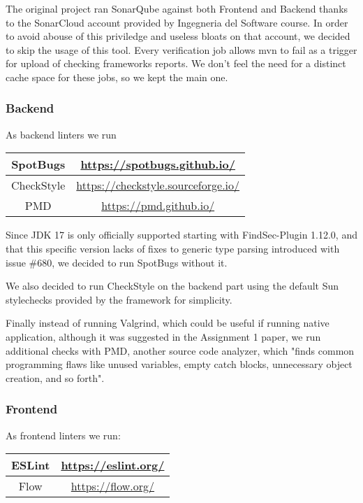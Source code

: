 \documentclass[a4paper,10pt]{scrartcl}
\begin{document}
The original project ran SonarQube against both Frontend and Backend thanks to the SonarCloud account provided by Ingegneria del Software course. In order to avoid abouse of this priviledge and useless bloats on that account, we decided to skip the usage of this tool.
Every verification job allows mvn to fail as a trigger for upload of checking frameworks reports. We don't feel the need for a distinct cache space for these jobs, so we kept the main one.

\subsubsection{Backend}
 
As backend linters we run

\begin{center}
    \begin{tabular}{|c|c|}
        \hline
        SpotBugs & \href{https://spotbugs.github.io/}{https://spotbugs.github.io/} \\
        \hline
        CheckStyle & \href{https://checkstyle.sourceforge.io/}{https://checkstyle.sourceforge.io/} \\
        \hline
        PMD & \href{https://pmd.github.io/}{https://pmd.github.io/} \\
        \hline
    \end{tabular}
\end{center}

Since JDK 17 is only officially supported starting with FindSec-Plugin 1.12.0, and that this specific version lacks of fixes to generic type parsing introduced with issue \#680, we decided to run SpotBugs without it.

We also decided to run CheckStyle on the backend part using the default Sun stylechecks provided by the framework for simplicity.

Finally instead of running Valgrind, which could be useful if running native application, although it was suggested in the Assignment 1 paper, we run additional checks with PMD, another source code analyzer, which "finds common programming flaws like unused variables, empty catch blocks, unnecessary object creation, and so forth".

\subsubsection{Frontend}

As frontend linters we run:
\begin{center}
    \begin{tabular}{|c|c|}
        \hline
        ESLint & \href{https://eslint.org/}{https://eslint.org/} \\
        \hline
        Flow & \href{https://flow.org/}{https://flow.org/} \\
        \hline
    \end{tabular}
\end{center}
\end{document}
